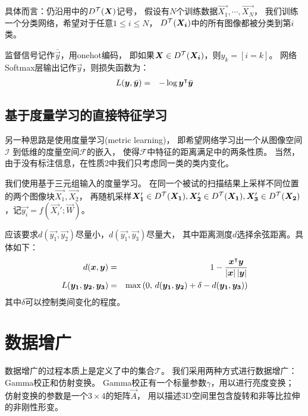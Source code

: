 具体而言：仍沿用中的$D^{\mathcal{T}}(\boldsymbol{X})$记号，
假设有$N$个训练数据$\vec{X_1},\cdots,\vec{X_N}$，
我们训练一个分类网络，希望对于任意$1\le i \le N$，
$D^{\mathcal{T}}(\boldsymbol{X_i})$中的所有图像都被分类到第$i$类。

监督信号记作$\bar{\vec{y}}$，用onehot编码，
即如果$\boldsymbol{X}\in D^{\mathcal{T}}(\boldsymbol{X_i})$，则$y_k=[i=k]$。
网络Softmax层输出记作$\vec{y}$，则损失函数为：
\begin{eqnarray}
    L(\boldsymbol{y}, \bar{\boldsymbol{y}}) &=& -\log \boldsymbol{y}^\intercal\bar{\boldsymbol{y}}
\end{eqnarray}

\subsection{基于度量学习的直接特征学习\label{sec:cnn:loss:mtrc}}
另一种思路是使用度量学习(metric learning)，
即希望网络学习出一个从图像空间$\mathcal{I}$
到低维的度量空间$\mathcal{F}$的嵌入，
使得$\mathcal{F}$中特征的距离满足中的两条性质。
当然，由于没有标注信息，在性质2中我们只考虑同一类的类内变化。

我们使用基于三元组输入的度量学习。
在同一个被试的扫描结果上采样不同位置的两个图像块$\vec{X_1}, \vec{X_2}$，
再随机采样$\boldsymbol{X_1}' \in D^{\mathcal{T}}(\boldsymbol{X_1}), \boldsymbol{X_2}' \in D^{\mathcal{T}}(\boldsymbol{X_1}),
\boldsymbol{X_3}' \in D^{\mathcal{T}}(\boldsymbol{X_2})$，记$\vec{y_i}=f(\vec{X_i}';\vec{W})$。

应该要求$d(\vec{y_1},\vec{y_2})$尽量小，$d(\vec{y_1}, \vec{y_3})$尽量大，
其中距离测度$d$选择余弦距离。具体如下：
\begin{eqnarray}
    d(\boldsymbol{x}, \boldsymbol{y}) &=& 1 -
        \frac{\boldsymbol{x}^\intercal\boldsymbol{y}}{\left|\boldsymbol{x}\right|\left|\boldsymbol{y}\right|} \nonumber \\
    L(\boldsymbol{y_1}, \boldsymbol{y_2}, \boldsymbol{y_3}) &=&
        \max\left(0,\, d(\boldsymbol{y_1}, \boldsymbol{y_2}) + \delta - d(\boldsymbol{y_1}, \boldsymbol{y_3})
        \right)
    \label{eqn:cnn:mtrc:loss}
\end{eqnarray}
其中$\delta$可以控制类间变化的程度。

\section{数据增广\label{sec:cnn:aug}}
数据增广的过程本质上是定义了中的集合$\mathcal{T}$。
我们采用两种方式进行数据增广：Gamma校正和仿射变换。
Gamma校正有一个标量参数$\gamma$，用以进行亮度变换；
仿射变换的参数是一个$3\times 4$的矩阵$\vec{A}$，
用以描述3D空间里包含旋转和非等比拉伸的非刚性形变。

